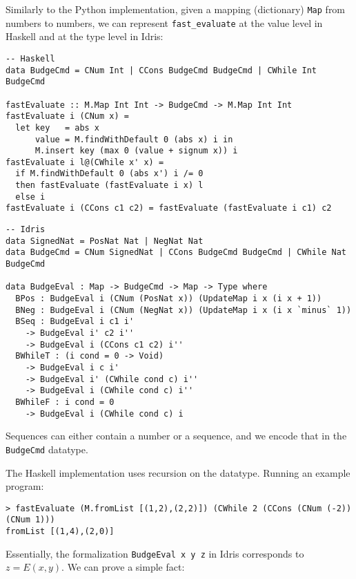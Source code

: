\documentclass{article}
\begin{document}
\pagebreak

Similarly to the Python implementation, given a mapping (dictionary) \texttt{Map} from numbers to numbers, we can represent \texttt{fast\_evaluate} at the value level in Haskell and at the type level in Idris:

\begin{minipage}[t]{0.49\textwidth}
\begin{lstlisting}
-- Haskell
data BudgeCmd = CNum Int | CCons BudgeCmd BudgeCmd | CWhile Int BudgeCmd

fastEvaluate :: M.Map Int Int -> BudgeCmd -> M.Map Int Int
fastEvaluate i (CNum x) =
  let key   = abs x
      value = M.findWithDefault 0 (abs x) i in
      M.insert key (max 0 (value + signum x)) i
fastEvaluate i l@(CWhile x' x) =
  if M.findWithDefault 0 (abs x') i /= 0
  then fastEvaluate (fastEvaluate i x) l
  else i
fastEvaluate i (CCons c1 c2) = fastEvaluate (fastEvaluate i c1) c2
\end{lstlisting}
\end{minipage}
\begin{minipage}[t]{0.49\textwidth}
\begin{lstlisting}
-- Idris
data SignedNat = PosNat Nat | NegNat Nat
data BudgeCmd = CNum SignedNat | CCons BudgeCmd BudgeCmd | CWhile Nat BudgeCmd

data BudgeEval : Map -> BudgeCmd -> Map -> Type where
  BPos : BudgeEval i (CNum (PosNat x)) (UpdateMap i x (i x + 1))
  BNeg : BudgeEval i (CNum (NegNat x)) (UpdateMap i x (i x `minus` 1))
  BSeq : BudgeEval i c1 i'
    -> BudgeEval i' c2 i''
    -> BudgeEval i (CCons c1 c2) i''
  BWhileT : (i cond = 0 -> Void)
    -> BudgeEval i c i'
    -> BudgeEval i' (CWhile cond c) i''
    -> BudgeEval i (CWhile cond c) i''
  BWhileF : i cond = 0
    -> BudgeEval i (CWhile cond c) i
\end{lstlisting}
\end{minipage}

Sequences can either contain a number or a sequence, and we encode that in the \texttt{BudgeCmd} datatype.

The Haskell implementation uses recursion on the datatype. Running an example program:

\begin{verbatim}
> fastEvaluate (M.fromList [(1,2),(2,2)]) (CWhile 2 (CCons (CNum (-2)) (CNum 1)))
fromList [(1,4),(2,0)]
\end{verbatim}

Essentially, the formalization \texttt{BudgeEval x y z} in Idris corresponds to $z = E(x, y)$. We can prove a simple fact:
\end{document}
